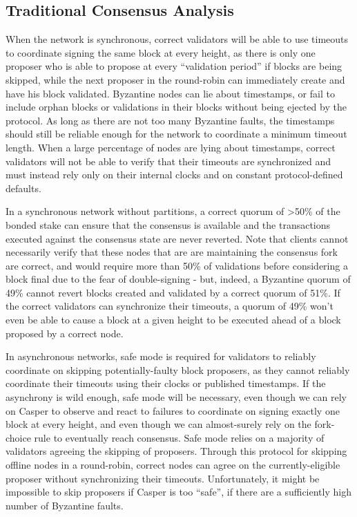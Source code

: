 \documentclass[11pt,a4paper]{article}
\begin{document}
\subsection{Traditional Consensus Analysis}


When the network is synchronous, correct validators will be able to use timeouts to coordinate signing the same block at every height, as there is only one proposer who is able to propose at every ``validation period'' if blocks are being skipped, while the next proposer in the round-robin can immediately create and have his block validated. Byzantine nodes can lie about timestamps, or fail to include orphan blocks or validations in their blocks without being ejected by the protocol. As long as there are not too many Byzantine faults, the timestamps should still be reliable enough for the network to coordinate a minimum timeout length. When a large percentage of nodes are lying about timestamps, correct validators will not be able to verify that their timeouts are synchronized and must instead rely only on their internal clocks and on constant protocol-defined defaults.

In a synchronous network without partitions, a correct quorum of >50\% of the bonded stake can ensure that the consensus is available and the transactions executed against the consensus state are never reverted. Note that clients cannot necessarily verify that these nodes that are are maintaining the consensus fork are correct, and would require more than 50\% of validations before considering a block final due to the fear of double-signing - but, indeed, a Byzantine quorum of 49\% cannot revert blocks created and validated by a correct quorum of 51\%. If the correct validators can synchronize their timeouts, a quorum of 49\% won't even be able to cause a block at a given height to be executed ahead of a block proposed by a correct node.

In asynchronous networks, safe mode is required for validators to reliably coordinate on skipping potentially-faulty block proposers, as they cannot reliably coordinate their timeouts using their clocks or published timestamps. If the asynchrony is wild enough, safe mode will be necessary, even though we can rely on Casper to observe and react to failures to coordinate on signing exactly one block at every height, and even though we can almost-surely rely on the fork-choice rule to eventually reach consensus. Safe mode relies on a majority of validators agreeing the skipping of proposers. Through this protocol for skipping offline nodes in a round-robin, correct nodes can agree on the currently-eligible proposer without synchronizing their timeouts. Unfortunately, it might be impossible to skip proposers if Casper is too ``safe'', if there are a sufficiently high number of Byzantine faults. 
\end{document}
